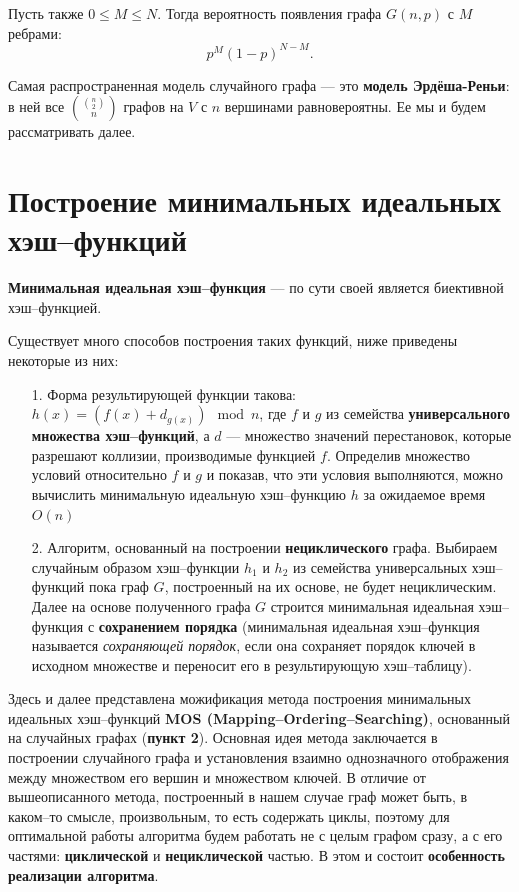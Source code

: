 \documentclass[specialist,
               substylefile = spbu.rtx,
               subf,href,colorlinks=true, 12pt]{disser}
\begin{document}
Пусть также $0 \leq M \leq N$. Тогда вероятность появления графа $G(n,p)$ с $M$ ребрами:
%
\begin{equation}
p^M(1-p)^{N - M}.
\end{equation}
%

Самая распространенная модель случайного графа --- это \textbf{модель Эрдёша-Реньи}: в ней все $\binom{\binom{n}{2}}{n}$ графов на $V$ с $n$ вершинами равновероятны. Ее мы и будем рассматривать далее.


\newpage

\section{Построение минимальных идеальных хэш--функций}

\textbf{Минимальная идеальная хэш--функция} --- по сути своей является биективной хэш--функцией. 

Существует много способов построения таких функций, ниже приведены некоторые из них:

\begin{itemize}
\item[1.] Форма результирующей функции такова: $h(x) = (f(x) + d_{g(x)}) \mod n$, где $f$ и $g$ из семейства \textbf{универсального множества хэш--функций}, а $d$ --- множество значений перестановок, которые разрешают коллизии, производимые функцией $f$. Определив множество условий относительно $f$ и $g$ и показав, что эти условия выполняются, можно вычислить минимальную идеальную хэш--функцию $h$ за ожидаемое время $\mathit{O}(n)$
\item[2.] Алгоритм, основанный на построении \textbf{нециклического} графа. Выбираем случайным образом хэш--функции $h_1$ и $h_2$ из семейства универсальных хэш--функций пока граф $G$, построенный на их основе, не будет нециклическим. Далее на основе полученного графа $G$ строится минимальная идеальная хэш--функция с \textbf{сохранением порядка} (минимальная идеальная хэш--функция называется \textit{сохраняющей порядок}, если она сохраняет порядок ключей в исходном множестве и переносит его в результирующую хэш--таблицу).\label{alg2}
\end{itemize}

Здесь и далее представлена можификация метода построения минимальных идеальных хэш--функций \textbf{MOS (Mapping--Ordering--Searching)}, основанный на случайных графах (\textbf{пункт 2}).
Основная идея метода заключается в построении случайного графа и установления взаимно однозначного отображения между множеством его вершин и множеством ключей. В отличие от вышеописанного метода, построенный в нашем случае граф может быть, в каком--то смысле, произвольным, то есть содержать циклы, поэтому для оптимальной работы алгоритма будем работать не с целым графом сразу, а с его частями: \textbf{циклической} и \textbf{нециклической} частью. В этом и состоит \textbf{особенность реализации алгоритма}.
\end{document}

